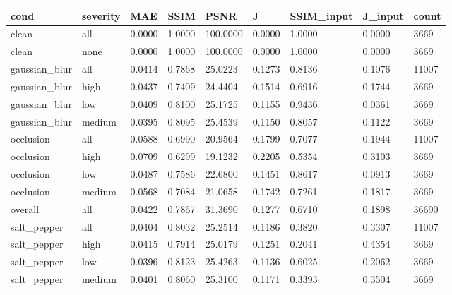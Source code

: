 \begin{tabular}{lllllllll}
\hline
cond & severity & MAE & SSIM & PSNR & J & SSIM\_input & J\_input & count \\
\hline
clean & all & 0.0000 & 1.0000 & 100.0000 & 0.0000 & 1.0000 & 0.0000 & 3669 \\
clean & none & 0.0000 & 1.0000 & 100.0000 & 0.0000 & 1.0000 & 0.0000 & 3669 \\
gaussian\_blur & all & 0.0414 & 0.7868 & 25.0223 & 0.1273 & 0.8136 & 0.1076 & 11007 \\
gaussian\_blur & high & 0.0437 & 0.7409 & 24.4404 & 0.1514 & 0.6916 & 0.1744 & 3669 \\
gaussian\_blur & low & 0.0409 & 0.8100 & 25.1725 & 0.1155 & 0.9436 & 0.0361 & 3669 \\
gaussian\_blur & medium & 0.0395 & 0.8095 & 25.4539 & 0.1150 & 0.8057 & 0.1122 & 3669 \\
occlusion & all & 0.0588 & 0.6990 & 20.9564 & 0.1799 & 0.7077 & 0.1944 & 11007 \\
occlusion & high & 0.0709 & 0.6299 & 19.1232 & 0.2205 & 0.5354 & 0.3103 & 3669 \\
occlusion & low & 0.0487 & 0.7586 & 22.6800 & 0.1451 & 0.8617 & 0.0913 & 3669 \\
occlusion & medium & 0.0568 & 0.7084 & 21.0658 & 0.1742 & 0.7261 & 0.1817 & 3669 \\
overall & all & 0.0422 & 0.7867 & 31.3690 & 0.1277 & 0.6710 & 0.1898 & 36690 \\
salt\_pepper & all & 0.0404 & 0.8032 & 25.2514 & 0.1186 & 0.3820 & 0.3307 & 11007 \\
salt\_pepper & high & 0.0415 & 0.7914 & 25.0179 & 0.1251 & 0.2041 & 0.4354 & 3669 \\
salt\_pepper & low & 0.0396 & 0.8123 & 25.4263 & 0.1136 & 0.6025 & 0.2062 & 3669 \\
salt\_pepper & medium & 0.0401 & 0.8060 & 25.3100 & 0.1171 & 0.3393 & 0.3504 & 3669 \\
\hline
\end{tabular}
